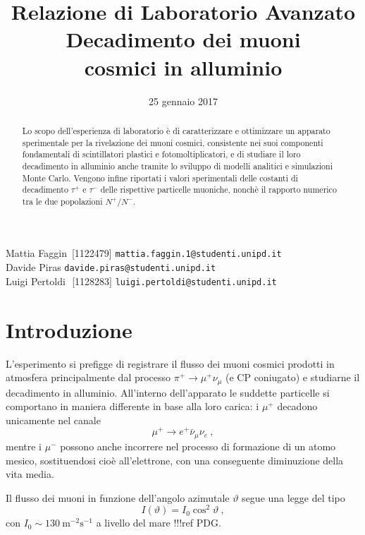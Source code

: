 \documentclass[10pt, oneside, a4paper]{article}   	%
\title{\large{Relazione di Laboratorio Avanzato}\\\Huge{Decadimento dei muoni \\ cosmici in alluminio}}
\date{25 gennaio 2017}
\renewcommand{\theta}{\vartheta}			%
\begin{document}
\maketitle
\thispagestyle{empty}
%
\vspace{4cm}
\begin{abstract}
	Lo scopo dell'esperienza di laboratorio è di caratterizzare e ottimizzare un apparato sperimentale per la rivelazione dei muoni cosmici, consistente nei suoi componenti fondamentali di scintillatori plastici e fotomoltiplicatori, e di studiare il loro decadimento in alluminio anche tramite lo sviluppo di modelli analitici e simulazioni Monte Carlo. Vengono infine riportati i valori sperimentali delle costanti di decadimento $\tau^+$ e $\tau^-$ delle rispettive particelle muoniche, nonchè il rapporto numerico tra le due popolazioni $N^+/N^-$.
\end{abstract}
\vspace*{\fill}
Mattia Faggin \;\,[1122479] \texttt{mattia.faggin.1@studenti.unipd.it} \\
Davide Piras \;\;\;\:[1114287] \texttt{davide.piras@studenti.unipd.it} \\
Luigi Pertoldi \;\,\,[1128283] \texttt{luigi.pertoldi@studenti.unipd.it}
\cleardoublepage
%
\tableofcontents
\clearpage
\listoffigures
\listoftables
%
\clearpage
\section{Introduzione}
L'esperimento si prefigge di registrare il flusso dei muoni cosmici prodotti in atmosfera principalmente dal processo $\pi^+\to\mu^+\nu_\mu$ (e CP coniugato) e studiarne il decadimento in alluminio. All'interno dell'apparato le suddette particelle si comportano in maniera differente in base alla loro carica: i $\mu^+$ decadono unicamente nel canale
\[\mu^+\to e^+\bar{\nu}_\mu\nu_e\ ,\]
mentre i $\mu^-$ possono anche incorrere nel processo di formazione di un atomo mesico, sostituendosi cioè all'elettrone, con una conseguente diminuzione della vita media.

Il flusso dei muoni in funzione dell'angolo azimutale $\theta$ segue una legge del tipo 
\[I(\theta)=I_0\cos^2\theta\ ,\]
con $I_0\sim130\ \text{m}^{-2}\text{s}^{-1}$ a livello del mare !!!ref PDG.
%
\end{document}
